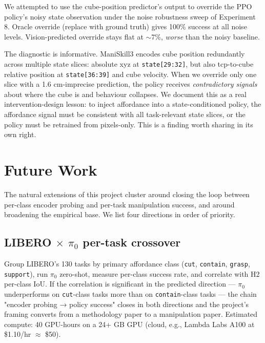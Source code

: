 \documentclass[11pt]{article}
\begin{document}
We attempted to use the cube-position predictor's output to override
the PPO policy's noisy state observation under the noise robustness
sweep of Experiment 8. Oracle override (replace with ground truth)
gives 100\% success at all noise levels. Vision-predicted override
stays flat at $\sim$7\%, \emph{worse} than the noisy baseline.

The diagnostic is informative. ManiSkill3 encodes cube position
redundantly across multiple state slices: absolute xyz at
\verb|state[29:32]|, but also tcp-to-cube relative position at
\verb|state[36:39]| and cube velocity. When we override only one slice
with a 1.6 cm-imprecise prediction, the policy receives
\emph{contradictory signals} about where the cube is and behaviour
collapses. We document this as a real intervention-design lesson: to
inject affordance into a state-conditioned policy, the affordance
signal must be consistent with all task-relevant state slices, or the
policy must be retrained from pixels-only. This is a finding worth
sharing in its own right.

\section{Future Work}
\label{sec:future}

The natural extensions of this project cluster around closing the loop
between per-class encoder probing and per-task manipulation success,
and around broadening the empirical base. We list four directions in
order of priority.

\subsection{LIBERO $\times$ $\pi_0$ per-task crossover}

Group LIBERO's 130 tasks by primary affordance class
(\texttt{cut}, \texttt{contain}, \texttt{grasp}, \texttt{support}),
run $\pi_0$ zero-shot, measure per-class success rate, and correlate
with H2 per-class IoU. If the correlation is significant in the
predicted direction --- $\pi_0$ underperforms on \texttt{cut}-class
tasks more than on \texttt{contain}-class tasks --- the chain
"encoder probing → policy success" closes in both directions and the
project's framing converts from a methodology paper to a manipulation
paper. Estimated compute: 40 GPU-hours on a 24+ GB GPU (cloud, e.g.,
Lambda Labs A100 at \$1.10/hr $\approx$ \$50).
\end{document}
